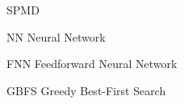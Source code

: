 
\begin{listofabbrv}{SPMD}
    \item[NN] Neural Network
    \item[FNN] Feedforward Neural Network
    \item[GBFS] Greedy Best-First Search
\end{listofabbrv}

